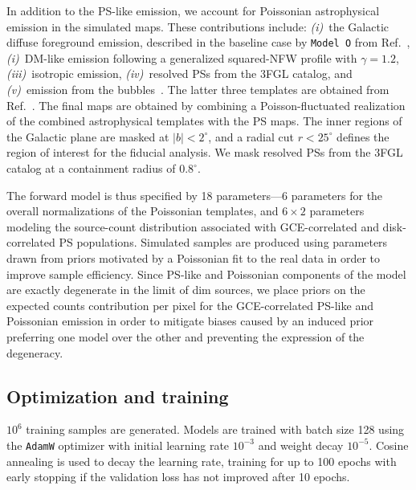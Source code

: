 \documentclass[prd,aps,10pt,nofootinbib,twocolumn,superscriptaddress,preprintnumbers,balancelastpage,longbibliography]{revtex4-1}
\begin{document}
In addition to the PS-like emission, we account for Poissonian astrophysical emission in the simulated maps.  These contributions include: \emph{(i)}~the Galactic diffuse foreground emission, described in the baseline case by \texttt{Model~O} from Ref.~\cite{Buschmann:2020adf}, \emph{(i)}~DM-like emission following a generalized squared-NFW profile with $\gamma=1.2$, \emph{(iii)}~isotropic emission, \emph{(iv)}~resolved PSs from the 3FGL catalog, and \emph{(v)}~emission from the \Fermi bubbles~\cite{Su:2010qj}. The latter three templates are obtained from Ref.~\cite{rodd_nicholas_safdi_siddharth_2016}. The final maps are obtained by combining a Poisson-fluctuated realization of the combined astrophysical templates with the PS maps. The inner regions of the Galactic plane are masked at $|b| < 2^\circ$, and a radial cut $r < 25^\circ$ defines the region of interest for the fiducial analysis. We mask resolved PSs from the 3FGL catalog at a containment radius of $0.8^\circ$.   

The forward model is thus specified by 18 parameters---6 parameters for the overall normalizations of the Poissonian templates, and $6\times2$ parameters modeling the source-count distribution associated with GCE-correlated and disk-correlated PS populations. Simulated samples are produced using parameters drawn from priors motivated by a Poissonian fit to the real \Fermi data in order to improve sample efficiency. Since PS-like and Poissonian components of the model are exactly degenerate in the limit of dim sources, we place priors on the expected counts contribution per pixel for the GCE-correlated PS-like and Poissonian emission in order to mitigate biases caused by an induced prior preferring one model over the other and preventing the expression of the degeneracy.

\subsection{Optimization and training}

$10^{6}$ training samples are generated. Models are trained with batch size 128 using the \texttt{AdamW} optimizer with initial learning rate $10^{-3}$ and weight decay $10^{-5}$. Cosine annealing is used to decay the learning rate, training for up to 100 epochs with early stopping if the validation loss has not improved after 10 epochs.
\end{document}
